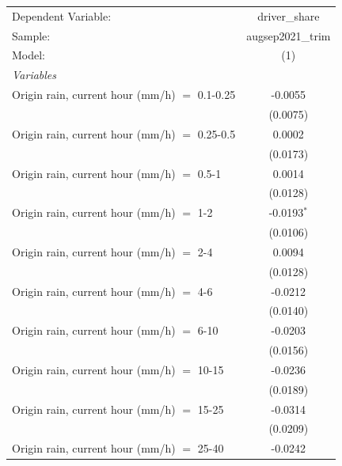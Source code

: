 \ifdefined\ifclassloaded
{}
\fi

\begingroup
\centering
\begin{tabular}{lc}
   \tabularnewline \midrule \midrule
   Dependent Variable:                           & driver\_share\\   
   Sample:                                       & augsep2021\_trim \\    
   Model:                                        & (1)\\  
   \midrule
   \emph{Variables}\\
   Origin rain, current hour (mm/h) $=$ 0.1-0.25 & -0.0055\\   
                                                 & (0.0075)\\   
   Origin rain, current hour (mm/h) $=$ 0.25-0.5 & 0.0002\\   
                                                 & (0.0173)\\   
   Origin rain, current hour (mm/h) $=$ 0.5-1    & 0.0014\\   
                                                 & (0.0128)\\   
   Origin rain, current hour (mm/h) $=$ 1-2      & -0.0193$^{*}$\\   
                                                 & (0.0106)\\   
   Origin rain, current hour (mm/h) $=$ 2-4      & 0.0094\\   
                                                 & (0.0128)\\   
   Origin rain, current hour (mm/h) $=$ 4-6      & -0.0212\\   
                                                 & (0.0140)\\   
   Origin rain, current hour (mm/h) $=$ 6-10     & -0.0203\\   
                                                 & (0.0156)\\   
   Origin rain, current hour (mm/h) $=$ 10-15    & -0.0236\\   
                                                 & (0.0189)\\   
   Origin rain, current hour (mm/h) $=$ 15-25    & -0.0314\\   
                                                 & (0.0209)\\   
   Origin rain, current hour (mm/h) $=$ 25-40    & -0.0242\\   

\end{tabular}
